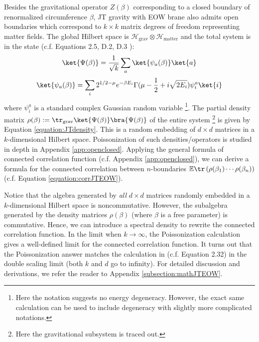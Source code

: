 \documentclass[a4paper,11pt]{article}
\theoremstyle{definition}
\numberwithin{equation}{section}
\newcommand{\lb}{\left(}
\newcommand{\rb}{\right)}
\begin{document}
Besides the gravitational operator $Z(\beta)$ corresponding to a closed boundary of renormalized circumference $\beta$, JT gravity with EOW brane also admits open boundaries which correspond to $k\times k$ matrix degrees of freedom representing matter fields. The global Hilbert space is $\mathcal{H}_\text{grav}\otimes\mathcal{H}_\text{matter}$ and the total system is in the state (c.f. Equations 2.5, D.2, D.3 \cite{Penington:2019kki}):
\begin{equation}
    \ket{\Psi(\beta)} = \frac{1}{\sqrt{k}}\sum_a\ket{\psi_a(\beta)}\ket{a}
\end{equation}
\begin{equation}
   \ket{\psi_a(\beta)} = \sum_i 2^{1/2 - \mu}e^{-\beta E_i}\Gamma(\mu - \frac{1}{2} + i\sqrt{2E_i})\psi_i^a\ket{i}
\end{equation}
where $\psi_i^a$ is a standard complex Gaussian random variable \footnote{Here the notation suggests no energy degeneracy. However, the exact same calculation can be used to include degeneracy with slightly more complicated notations.}. The partial density matrix $\rho(\beta) := \tr_\text{grav}\ket{\Psi(\beta)}\bra{\Psi(\beta)}$ of the entire system \footnote{Here the gravitational subsystem is traced out.} is given by Equation \ref{equation:JTdensity}. This is a random embedding of $d\times d$ matrices in a $k$-dimensional Hilbert space. Poissonization of such densities/operators is studied in depth in Appendix \ref{app:openclosed}. Applying the general formula of connected correlation function (c.f. Appendix \ref{app:openclosed}), we can derive a formula for the connected correlation between $n$-boundaries $\mathbb{E}\tr\lb\rho(\beta_1)\cdots\rho(\beta_n)\rb$ (c.f. Equation \ref{equation:corrJTEOW}).

Notice that the algebra generated by \textit{all} $d\times d$ matrices randomly embedded in a $k$-dimensional Hilbert space is noncommutative. However, the subalgebra generated by the density matrices $\rho(\beta)$ (where $\beta$ is a free parameter) is commutative. Hence, we can introduce a spectral density to rewrite the connected correlation function. In the limit when $k\rightarrow\infty$, the Poissonization calculation gives a well-defined limit for the connected correlation function. It turns out that the Poissonization answer matches the calculation in \cite{Penington:2019kki} (c.f. Equation 2.32) in the double scaling limit (both $k$ and $d$ go to infinity). For detailed discussion and derivations, we refer the reader to Appendix \ref{subsection:mathJTEOW}.
\end{document}
